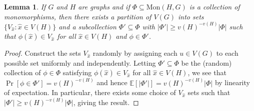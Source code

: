\documentclass[12pt,letterpaper]{article}
\newtheorem{lemma}[theorem]{Lemma}
\theoremstyle{definition}
\newcommand{\sub}{\subseteq}
\newcommand{\E}{\mathbb{E}}
\begin{document}
	\begin{lemma}\label{lemma:canonicalReduction}
		If $G$ and $H$ are graphs and if $\Phi\subseteq \mathrm{Mon}(H,G)$ is a collection of monomorphisms, then there exists a partition of $V(G)$ into sets $\{V_{\hat{x}}:\hat{x}\in V(H)\}$ and a subcollection $\Phi'\sub \Phi$ with $|\Phi'|\ge v(H)^{-v(H)}|\Phi|$ such that $\phi(\hat{x})\in V_{\hat{x}}$ for all $\hat{x}\in V(H)$ and $\phi\in \Phi'$.
	\end{lemma}
	
	\begin{proof}
		Construct the sets $V_{\hat{x}}$ randomly by assigning each $u\in V(G)$ to each possible set uniformly and independently.  Letting $\Phi'\sub \Phi$ be the (random) collection of $\phi\in \Phi$ satisfying $\phi(\hat{x})\in V_{\hat{x}}$ for all $\hat{x}\in V(H)$, we see that $\Pr[\phi\in \Phi']=v(H)^{-v(H)}$ and hence $\E[|\Phi'|]=v(H)^{-v(H)}|\Phi|$ by linearity of expectation.  In particular, there exists some choice of $V_{\hat{x}}$ sets such that $|\Phi'|\ge v(H)^{-v(H)}|\Phi|$, giving the result.
	\end{proof}
	
\end{document}
